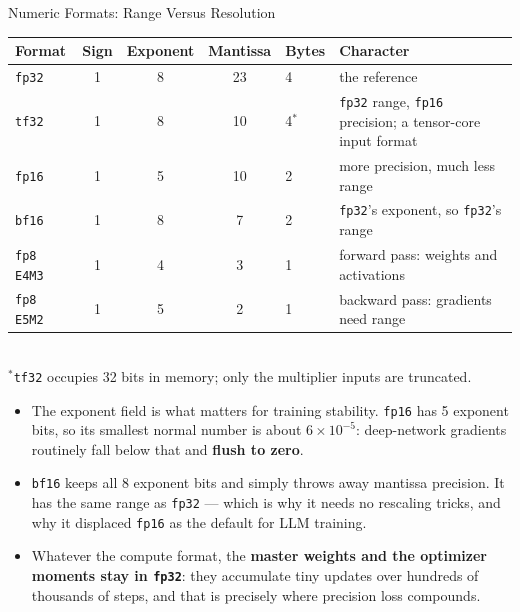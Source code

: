 \begin{frame}{Numeric Formats: Range Versus Resolution}
  \centering
  \scriptsize
  \begin{tabular}{@{}lccclp{4.0cm}@{}}
    \toprule
    \textbf{Format} & \textbf{Sign} & \textbf{Exponent} & \textbf{Mantissa} & \textbf{Bytes} & \textbf{Character} \\
    \midrule
    \texttt{fp32}  & 1 & 8 & 23 & 4 & the reference \\
    \texttt{tf32}  & 1 & 8 & 10 & 4$^{*}$ & \texttt{fp32} range, \texttt{fp16} precision; a tensor-core input format \\
    \texttt{fp16}  & 1 & 5 & 10 & 2 & more precision, much less range \\
    \texttt{bf16}  & 1 & 8 & 7  & 2 & \texttt{fp32}'s exponent, so \texttt{fp32}'s range \\
    \texttt{fp8 E4M3} & 1 & 4 & 3 & 1 & forward pass: weights and activations \\
    \texttt{fp8 E5M2} & 1 & 5 & 2 & 1 & backward pass: gradients need range \\
    \bottomrule
  \end{tabular}\\[0.25em]
  {\scriptsize $^{*}$\texttt{tf32} occupies 32 bits in memory; only the multiplier inputs are truncated.}
  \vspace{0.18em}
  \begin{itemize}\scriptsize\itemsep0.05em
    \item[\textcolor{red}{$\blacktriangleright$}] The exponent field is what matters for training stability. \texttt{fp16} has 5 exponent bits, so its smallest normal number is about $6 \times 10^{-5}$: deep-network gradients routinely fall below that and \textbf{flush to zero}.
    \item[\textcolor{red}{$\blacktriangleright$}] \texttt{bf16} keeps all 8 exponent bits and simply throws away mantissa precision. It has the same range as \texttt{fp32} --- which is why it needs no rescaling tricks, and why it displaced \texttt{fp16} as the default for LLM training.
    \item[\textcolor{red}{$\blacktriangleright$}] Whatever the compute format, the \textbf{master weights and the optimizer moments stay in \texttt{fp32}}: they accumulate tiny updates over hundreds of thousands of steps, and that is precisely where precision loss compounds.
  \end{itemize}
\end{frame}

